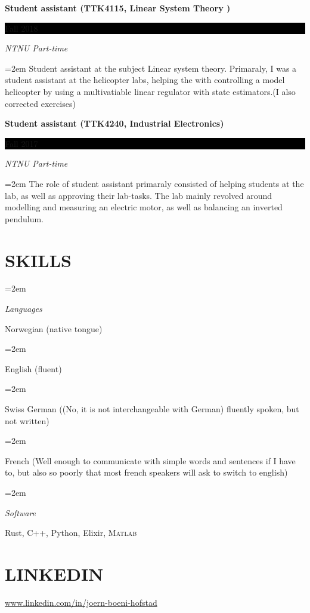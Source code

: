 \documentclass[paper=a4,fontsize=11pt,norsk]{scrartcl} %
\newlength{\spacebox}
\newcommand{\NewPart}[1]{\section*{\uppercase{#1}}}
\newcommand{\PersonalEntry}[2]{
		\noindent\hangindent=2em\hangafter=0 %
		\parbox{\spacebox}{        %
		\textit{#1}}		       %
		\hspace{1.5em} #2 \par}    %
\newcommand{\SkillsEntry}[2]{      %
		\noindent\hangindent=2em\hangafter=0 %
		\parbox{\spacebox}{        %
		\textit{#1}}			   %
		\hspace{1.5em} #2 \par}    %
\newcommand{\EducationEntry}[4]{
		\noindent \textbf{#1} \hfill      %
		\colorbox{Black}{%
			\parbox{6em}{%
			\hfill\color{White}#2}} \par  %
		\noindent \textit{#3} \par        %
		\noindent\hangindent=2em\hangafter=0 \small #4 %
		\normalsize \par}
\begin{document}
\EducationEntry{Student assistant (TTK4115, Linear System Theory )}{Fall 2018}{NTNU Part-time}
{Student assistant at the subject Linear system theory. Primaraly, I was a student assistant at the helicopter labs, helping the with controlling a model helicopter by using a multivatiable linear regulator with state estimators.(I also corrected exercises) 
}
\EducationEntry{Student assistant (TTK4240, Industrial Electronics)}{Fall 2017}{NTNU Part-time}
{The role of student assistant primaraly consisted of helping students at the lab, as well as approving their lab-tasks. 
The lab mainly revolved around modelling and measuring an electric motor, as well as balancing an inverted pendulum.
}


\NewPart{Skills}{}

\SkillsEntry{Languages}{Norwegian (native tongue)}
\SkillsEntry{}{English (fluent)}
\SkillsEntry{}{Swiss German  ((No, it is not interchangeable with German) fluently spoken, but not  written)}
\SkillsEntry{}{French (Well enough to communicate with simple words and sentences if I have to, but also so poorly that most french speakers will ask to switch to english)}

\SkillsEntry{Software}{ Rust,  C++, Python, Elixir, \textsc{Matlab}}



\NewPart{Linkedin}{
\url{www.linkedin.com/in/joern-boeni-hofstad}
}
\end{document}
